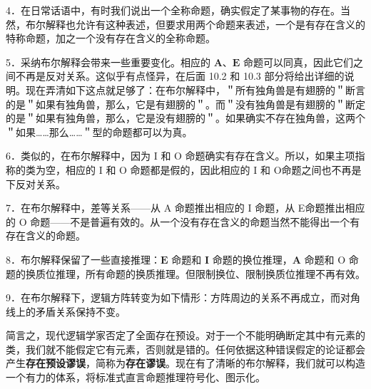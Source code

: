 4．在日常话语中，有时我们说出一个全称命题，确实假定了某事物的存在。当然，布尔解释也允许有这种表述，但要求用两个命题来表述，一个是有存在含义的特称命题，加之一个没有存在含义的全称命题。

5．采纳布尔解释会带来一些重要变化。相应的 $\mathbf{A、E}$ 命题可以同真，因此它们之间不再是反对关系。这似乎有点怪异，在后面 10.2 和 10.3 部分将给出详细的说明。现在弄清如下这点就足够了：在布尔解释中，＂所有独角兽是有翅膀的＂断言的是＂如果有独角兽，那么，它是有翅膀的＂。而＂没有独角兽是有翅膀的＂断定的是＂如果有独角兽，那么，它是没有翅膀的＂。如果确实不存在独角兽，这两个＂如果……那么……＂型的命题都可以为真。

6．类似的，在布尔解释中，因为 I 和 O 命题确实有存在含义。所以，如果主项指称的类为空，相应的 I 和 O 命题都是假的，因此相应的 I 和 O命题之间也不再是下反对关系。

7．在布尔解释中，差等关系——从 A 命题推出相应的 I 命题，从 E命题推出相应的 O 命题——不是普遍有效的。从一个没有存在含义的命题当然不能得出一个有存在含义的命题。

8．布尔解释保留了一些直接推理：$\mathbf{E}$ 命题和 $\mathbf{I}$ 命题的换位推理，$\mathbf{A}$ 命题和 O 命题的换质位推理，所有命题的换质推理。但限制换位、限制换质位推理不再有效。

9．在布尔解释下，逻辑方阵转变为如下情形：方阵周边的关系不再成立，而对角线上的矛盾关系保持不变。

简言之，现代逻辑学家否定了全面存在预设。对于一个不能明确断定其中有元素的类，我们就不能假定它有元素，否则就是错的。任何依据这种错误假定的论证都会产生\textbf{存在预设谬误}，简称为\textbf{存在谬误}。现在有了清晰的布尔解释，我们就可以构造一个有力的体系，将标准式直言命题推理符号化、图示化。



